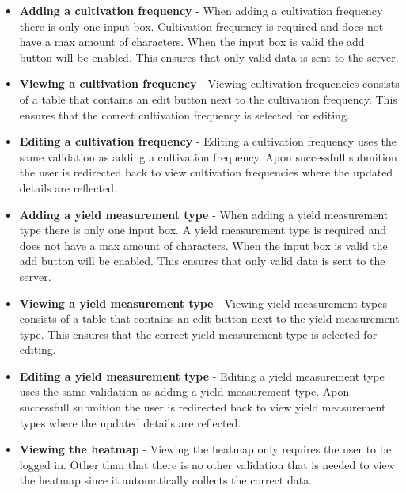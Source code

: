 \documentclass[11pt,fleqn]{book} %
\begin{document}
\begin{itemize}
				\item \textbf{Adding a cultivation frequency} -
				When adding a cultivation frequency there is only one input box. Cultivation frequency is required and does not have a max amount of characters. When the input box is valid the add button will be enabled. This ensures that only valid data is sent to the server.
				
				\item \textbf{Viewing a cultivation frequency} -
				Viewing cultivation frequencies consists of a table that contains an edit button next to the cultivation frequency. This ensures that the correct cultivation frequency is selected for editing.
				
				\item \textbf{Editing a cultivation frequency} -
				Editing a cultivation frequency uses the same validation as adding a cultivation frequency. Apon successfull submition the user is redirected back to view cultivation frequencies where the updated details are reflected.
				
				\item \textbf{Adding a yield measurement type} -
				When adding a yield measurement type there is only one input box. A yield measurement type is required and does not have a max amount of characters. When the input box is valid the add button will be enabled. This ensures that only valid data is sent to the server.
				
				\item \textbf{Viewing a yield measurement type} -
				Viewing yield measurement types consists of a table that contains an edit button next to the yield measurement type. This ensures that the correct yield measurement type is selected for editing.
				
				\item \textbf{Editing a yield measurement type} -
				Editing a yield measurement type uses the same validation as adding a yield measurement type. Apon successfull submition the user is redirected back to view yield measurement types where the updated details are reflected.
				
				\item \textbf{Viewing the heatmap} -
				Viewing the heatmap only requires the user to be logged in. Other than that there is no other validation that is needed to view the heatmap since it automatically collects the correct data.
			\end{itemize}
\end{document}
